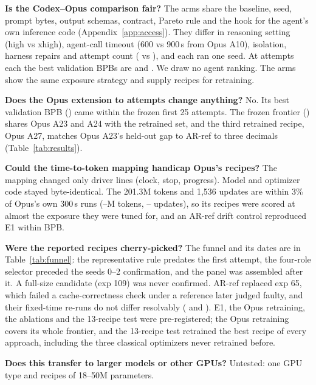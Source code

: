 \documentclass{article}
\begin{document}
\textbf{Is the Codex--Opus comparison fair?} The arms share the baseline, seed, prompt bytes, output schemas, contract, Pareto rule and the hook for the agent's own inference code (Appendix~\ref{app:access}). They differ in reasoning setting (high vs xhigh), agent-call timeout (600 vs 900\,s from Opus A10), isolation, harness repairs and attempt count (\CRCxAttempts{} vs \CROpAttempts), and each ran one seed. At \CRCxAttempts{} attempts each the best validation BPBs are \CRCxBestBPB{} and \CROpBestTwentyTwo. We draw no agent ranking. The arms show the same exposure strategy and supply recipes for retraining.

\textbf{Does the Opus extension to \CROpAttempts{} attempts change anything?} No. Its best validation BPB (\CROpBestFrozen) came within the frozen first 25 attempts. The frozen frontier (\CROpFrontierFrozen) shares Opus A23 and A24 with the retrained set, and the third retrained recipe, Opus A27, matches Opus A23's held-out gap to AR-ref to three decimals (Table~\ref{tab:results}).

\textbf{Could the time-to-token mapping handicap Opus's recipes?} The mapping changed only driver lines (clock, stop, progress). Model and optimizer code stayed byte-identical. The 201.3M tokens and 1{,}536 updates are within 3\% of Opus's own 300\,s runs (\CROpTokLo--\CROpTokHi M tokens, \CROpUpdLo--\CROpUpdHi{} updates), so its recipes were scored at almost the exposure they were tuned for, and an AR-ref drift control reproduced E1 within \CRMTDriftAbs{} BPB.

\textbf{Were the reported recipes cherry-picked?} The funnel and its dates are in Table~\ref{tab:funnel}: the representative rule predates the first attempt, the four-role selector preceded the seeds 0--2 confirmation, and the panel was assembled after it. A full-size candidate (exp 109) was never confirmed. AR-ref replaced exp 65, which failed a cache-correctness check under a reference later judged faulty, and their fixed-time re-runs do not differ resolvably (\CRFixedSixtyFive{} and \CRFixedSixtyEight). E1, the Opus retraining, the ablations and the 13-recipe test were pre-registered; the Opus retraining covers its whole frontier, and the 13-recipe test retrained the best recipe of every approach, including the three classical optimizers never retrained before.

\textbf{Does this transfer to larger models or other GPUs?} Untested: one GPU type and recipes of 18--50M parameters.
\end{document}
